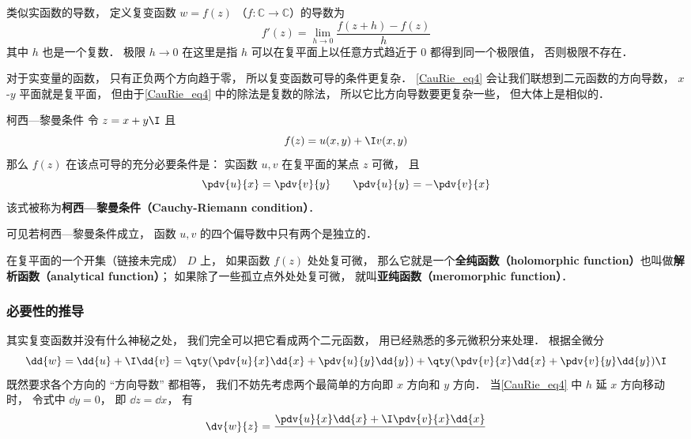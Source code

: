 
\begin{issues}
\issueTODO
\end{issues}


\begin{definition}{}
类似实函数的导数， 定义复变函数 $w = f(z)$ （$f:\mathbb C\to \mathbb C$）的导数为
\begin{equation}\label{CauRie_eq4}
f'(z) = \lim_{h\to 0} \frac{f(z + h) - f(z)}{h}
\end{equation}
其中 $h$ 也是一个复数． 极限 $h \to 0$ 在这里是指 $h$ 可以在复平面上以任意方式趋近于 $0$ 都得到同一个极限值， 否则极限不存在．
\end{definition}

对于实变量的函数， 只有正负两个方向趋于零， 所以复变函数可导的条件更复杂． \autoref{CauRie_eq4} 会让我们联想到二元函数的方向导数， $x$-$y$ 平面就是复平面， 但由于\autoref{CauRie_eq4} 中的除法是复数的除法， 所以它比方向导数要更复杂一些， 但大体上是相似的．

\begin{theorem}{柯西—黎曼条件}
令 $z = x + y\I$ 且
\begin{equation}
f(z) = u(x, y) + \I v(x, y)
\end{equation}
那么 $f(z)$ 在该点可导的充分必要条件是： 实函数 $u,v$ 在复平面的某点 $z$ 可微， 且
\begin{equation}\label{CauRie_eq1}
\pdv{u}{x} = \pdv{v}{y} \qquad
\pdv{u}{y} = - \pdv{v}{x}
\end{equation}
该式被称为\textbf{柯西—黎曼条件（Cauchy-Riemann condition）}．
\end{theorem}
可见若柯西—黎曼条件成立， 函数 $u,v$ 的四个偏导数中只有两个是独立的．

在复平面的一个开集（链接未完成） $D$ 上， 如果函数 $f(z)$ 处处复可微， 那么它就是一个\textbf{全纯函数（holomorphic function）}也叫做\textbf{解析函数（analytical function）}； 如果除了一些孤立点外处处复可微， 就叫\textbf{亚纯函数（meromorphic function）}．

\subsubsection{必要性的推导}
其实复变函数并没有什么神秘之处， 我们完全可以把它看成两个二元函数， 用已经熟悉的多元微积分来处理． 根据全微分
\begin{equation}\label{CauRie_eq2}
\dd{w} = \dd{u} + \I \dd{v} = \qty(\pdv{u}{x} \dd{x} + \pdv{u}{y} \dd{y}) + \qty(\pdv{v}{x} \dd{x} + \pdv{v}{y} \dd{y})\I
\end{equation}
既然要求各个方向的 “方向导数” 都相等， 我们不妨先考虑两个最简单的方向即 $x$ 方向和 $y$ 方向． 当\autoref{CauRie_eq4} 中 $h$ 延 $x$ 方向移动时， 令式中 $\dd y = 0$， 即 $\dd z = \dd x$， 有
\begin{equation}
\dv{w}{z} = \frac{\pdv{u}{x} \dd{x} +  \I\pdv{v}{x} \dd{x}}{}
\end{equation}

